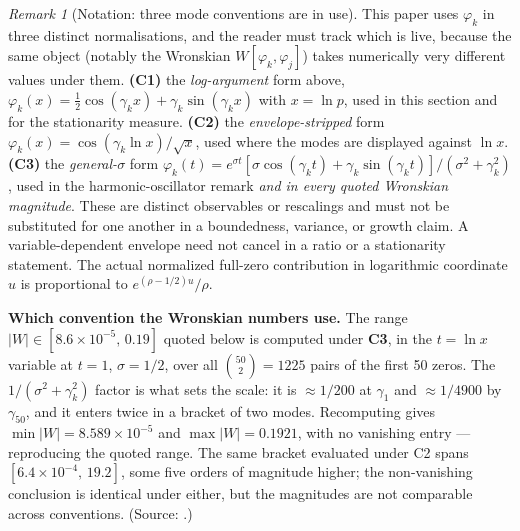 \documentclass[11pt,a4paper]{article}
\theoremstyle{plain}
\theoremstyle{definition}
\theoremstyle{remark}
\newtheorem{remark}[theorem]{Remark}
\begin{document}
\begin{remark}[Notation: three mode conventions are in use]
\label{rem:phi-conventions}
This paper uses $\varphi_k$ in three distinct normalisations, and the reader
must track which is live, because the same object (notably the Wronskian
$W[\varphi_k,\varphi_j]$) takes numerically very different values under them.
\textbf{(C1)} the \emph{log-argument} form above,
$\varphi_k(x) = \tfrac12\cos(\gamma_k x) + \gamma_k\sin(\gamma_k x)$ with
$x = \ln p$, used in this section and for the stationarity measure.
\textbf{(C2)} the \emph{envelope-stripped} form
$\varphi_k(x) = \cos(\gamma_k \ln x)/\sqrt{x}$, used where the modes are
displayed against $\ln x$.
\textbf{(C3)} the \emph{general-$\sigma$} form
$\varphi_k(t) = e^{\sigma t}\left[\sigma\cos(\gamma_k t) + \gamma_k\sin(\gamma_k t)\right]/(\sigma^2+\gamma_k^2)$,
used in the harmonic-oscillator remark \emph{and in every quoted Wronskian
magnitude}. These are distinct observables or rescalings and must not be
substituted for one another in a boundedness, variance, or growth claim.
A variable-dependent envelope need not cancel in a ratio or a stationarity
statement. The actual normalized full-zero contribution in logarithmic
coordinate $u$ is proportional to $e^{(\rho-1/2)u}/\rho$.

\medskip
\noindent
\textbf{Which convention the Wronskian numbers use.}  The range
$|W| \in [8.6\times10^{-5},\, 0.19]$ quoted below is computed under
\textbf{C3}, in the $t = \ln x$ variable at $t = 1$, $\sigma = 1/2$, over all
$\binom{50}{2} = 1225$ pairs of the first 50 zeros.  The $1/(\sigma^2+\gamma_k^2)$
factor is what sets the scale: it is $\approx 1/200$ at $\gamma_1$ and
$\approx 1/4900$ by $\gamma_{50}$, and it enters twice in a bracket of two
modes.  Recomputing gives $\min |W| = 8.589\times10^{-5}$ and
$\max |W| = 0.1921$, with no vanishing entry --- reproducing the quoted range.
The same bracket evaluated under C2 spans $[6.4\times10^{-4},\, 19.2]$, some
five orders of magnitude higher; the non-vanishing conclusion is identical
under either, but the magnitudes are not comparable across conventions.
(Source: .)
\end{remark}
\end{document}
